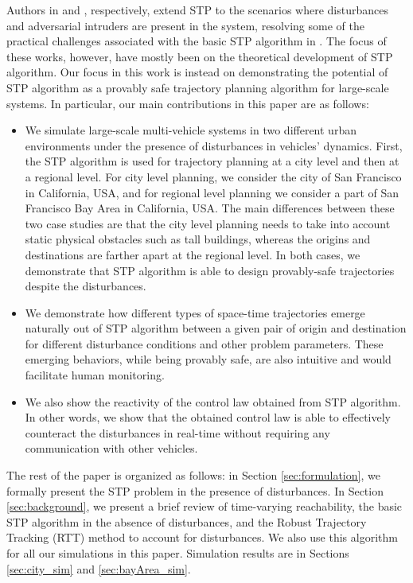 Authors in \cite{Bansal2017} and \cite{chen2016robust}, respectively, extend STP to the scenarios where disturbances and adversarial intruders are present in the system, resolving some of the practical challenges associated with the basic STP algorithm in \cite{Chen15c}. The focus of these works, however, have mostly been on the theoretical development of STP algorithm. Our focus in this work is instead on demonstrating the potential of STP algorithm as a provably safe trajectory planning algorithm for large-scale systems. In particular, our main contributions in this paper are as follows:
\begin{itemize}
\item We simulate large-scale multi-vehicle systems in two different urban environments under the presence of disturbances in vehicles' dynamics. First, the STP algorithm is used for trajectory planning at a city level and then at a regional level. For city level planning, we consider the city of San Francisco in California, USA, and for regional level planning we consider a part of San Francisco Bay Area in California, USA. The main differences between these two case studies are that the city level planning needs to take into account static physical obstacles such as tall buildings, whereas the origins and destinations are farther apart at the regional level. In both cases, we demonstrate that STP algorithm is able to design provably-safe trajectories despite the disturbances.
\item We demonstrate how different types of space-time trajectories emerge naturally out of STP algorithm between a given pair of origin and destination for different disturbance conditions and other problem parameters. These emerging behaviors, while being provably safe, are also intuitive and would facilitate human monitoring. 
\item We also show the reactivity of the control law obtained from STP algorithm. In other words, we show that the obtained control law is able to effectively counteract the disturbances in real-time without requiring any communication with other vehicles.
\end{itemize}

The rest of the paper is organized as follows: in Section \ref{sec:formulation}, we formally present the STP problem in the presence of disturbances. In Section \ref{sec:background}, we present a brief review of time-varying reachability, the basic STP algorithm \cite{Chen15c} in the absence of disturbances, and the Robust Trajectory Tracking (RTT) method \cite{Bansal2017} to account for disturbances. We also use this algorithm for all our simulations in this paper. Simulation results are in Sections \ref{sec:city_sim} and \ref{sec:bayArea_sim}.
